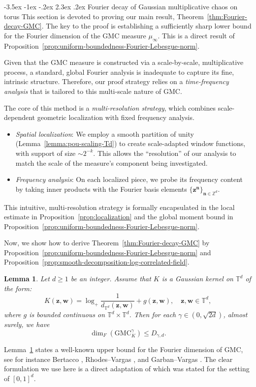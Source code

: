\documentclass[12pt]{amsart}
\makeatletter
\newtheorem{lemma}[theorem]{Lemma}
\theoremstyle{definition}
\theoremstyle{remark}
\newcommand{\bz}{\boldsymbol{z}}
\newcommand{\bw}{\boldsymbol{w}}
\newcommand{\Z}{\mathbb{Z}}
\newcommand{\T}{\mathbb{T}}
\newcommand{\GMC}{\mathrm{GMC}}
\renewcommand\section{\@startsection{section}{1}{\z@}%
	{-3.5ex \@plus -1ex \@minus -.2ex}%
	{2.3ex \@plus.2ex}%
	{\normalfont\large\bfseries}}%
\numberwithin{equation}{section}
\makeatother
\begin{document}
\section{Fourier decay of Gaussian multiplicative chaos on torus}\label{sec:proof-main-thm}
This section is devoted to proving our main result, Theorem~\ref{thm:Fourier-decay-GMC}. The key to the proof is establishing a sufficiently sharp lower bound for the Fourier dimension of the GMC measure $\mu_\infty$. This is a direct result of Proposition~\ref{prop:uniform-boundedness-Fourier-Lebesgue-norm}. 

Given that the GMC measure is constructed via a scale-by-scale, multiplicative process, a standard, global Fourier analysis is inadequate to capture its fine, intrinsic structure. Therefore, our proof strategy relies on a \textit{time-frequency analysis} that is tailored to this multi-scale nature of GMC.

The core of this method is a \textit{multi-resolution strategy}, which combines scale-dependent geometric localization with fixed frequency analysis.

\begin{itemize}
\item \textit{Spatial localization}: We employ a smooth partition of unity (Lemma~\ref{lemma:pou-scaling-Td}) to create scale-adapted window functions, with support of size $\sim 2^{-k}$. This allows the ``resolution'' of our analysis to match the scale of the measure’s component
being investigated.
\item \textit{Frequency analysis}: On each localized piece, we probe its frequency content by taking inner products with the Fourier basis elements $\{\bz^{\boldsymbol{n}}\}_{\boldsymbol{n}\in \Z^d}$.
\end{itemize}

This intuitive, multi-resolution strategy is formally encapsulated in the local estimate in Proposition~\ref{prop:localization} and the global moment bound in Proposition~\ref{prop:uniform-boundedness-Fourier-Lebesgue-norm}. 

Now, we show how to derive Theorem~\ref{thm:Fourier-decay-GMC} by Proposition~\ref{prop:uniform-boundedness-Fourier-Lebesgue-norm} and Proposition~\ref{prop:smooth-decomposition-log-correlated-field}.

\begin{lemma}\label{lemma:upper-bound}
	Let $d\ge 1$ be an integer. Assume that $K$ is a Gaussian kernel on $\T^d$ of the form:
	\[
	K(\bz,\bw)=\log_+\frac{1}{d_{\T^d}(\bz,\bw)}+g(\bz,\bw),\quad \bz,\bw\in \T^d,
	\]
	where $g$ is bounded continuous on $\T^d\times \T^d$. Then for each $\gamma\in (0,\sqrt{2d})$, almost surely, we have
	\[
	\dim_F (\GMC_K^\gamma)\le D_{\gamma,d}.
	\]
\end{lemma}
Lemma~\ref{lemma:upper-bound} states a well-known upper bound for the Fourier dimension of GMC, see for instance Bertacco \cite[Theorem~3.1 and Formula~(3.2)]{Ber23}, Rhodes--Vargas \cite[Section~4.2]{RV14}, and Garban--Vargas \cite[Remark~2]{GV23}. The clear formulation we use here is a direct adaptation of \cite[Lemma~3.6]{LQT25} which was stated for the setting of $[0,1]^d$.
\end{document}
